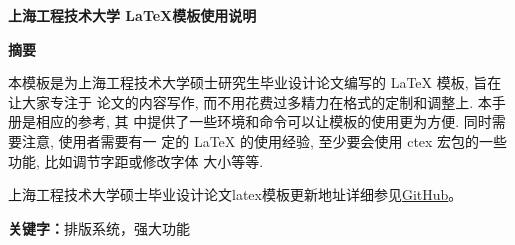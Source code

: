 
\begin{center}\heiti\sanhao\bfseries
    上海工程技术大学 \LaTeX 模板使用说明
\end{center}

\begin{center}\heiti\sanhao\textbf{
        摘\quad 要
    }
\end{center}

本模板是为上海工程技术大学硕士研究生毕业设计论文编写的 \LaTeX{} 模板, 旨在让大家专注于
论文的内容写作, 而不用花费过多精力在格式的定制和调整上. 本手册是相应的参考, 其
中提供了一些环境和命令可以让模板的使用更为方便. 同时需要注意, 使用者需要有一
定的 \LaTeX{} 的使用经验, 至少要会使用 ctex 宏包的一些功能, 比如调节字距或修改字体
大小等等.

上海工程技术大学硕士毕业设计论文latex模板更新地址详细参见\href{https://github.com/MobtgZhang/SUES-thsis}{GitHub}。

\vspace{1cm}

\noindent \textbf{关键字：}排版系统，强大功能

\clearpage

